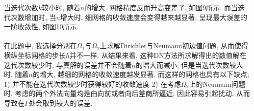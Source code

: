\documentclass[12pt]{article}
\begin{document}
\noindent 当迭代次数$k$较小时, 随着$n$的增大, 网格精度反而升高变差了, 如图9所示. 而当迭代次数增加时, 当$n$增大时, 细网格的收敛速度会变得越来越显著, 呈现最大误差的一阶收敛性, 如图10所示.\\
\quad \\
\noindent 在此题中, 我选择分别在$\Omega_1$与$\Omega_2$上求解Dirichlet与Neumann初边值问题, 从而使得横纵坐标网格的步长$h$并不一样. 从结果来看, 这种DN方法所求解得出的数值解在迭代次数较少时, 与真解的误差并不会随着$n$的增大而减小; 但是当迭代次数较大时, 随着$n$的增大, 越细的网格的收敛速度越发显著. 而这样的网格也具有以下缺点; 1) 并不能在迭代次数较少时获得较好的收敛速度 2) 在考虑$\Omega_2$上的Neumann问题时, 考虑的两个外法向量均是由向前或者向后差商所逼近, 因此容易引起扰动, 从而导致在$\Gamma$处会取到较大的误差.
\end{document}
